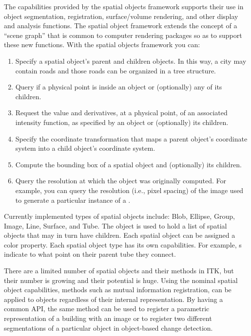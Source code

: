 The capabilities provided by the spatial objects framework supports their use
in object segmentation, registration, surface/volume rendering, and other
display and analysis functions. The spatial object framework extends the
concept of a ``scene graph''  that is common to computer rendering packages so
as to support these new functions. With the spatial objects framework you
can:
\begin{enumerate}

        \item Specify a spatial object's parent and children objects.  In
        this way, a city may contain roads and those roads can be
        organized in a tree structure.

        \item Query if a physical point is inside an object or
        (optionally) any of its children.

        \item Request the value and derivatives, at a physical point,
        of an associated intensity function, as specified
        by an object or (optionally) its children.

        \item Specify the coordinate transformation that maps a parent
        object's coordinate system into a child object's coordinate system.

        \item Compute the bounding box of a spatial object and (optionally)
        its children.

        \item Query the resolution at which the object was originally
        computed.  For example, you can query the resolution (i.e., pixel
        spacing) of the image used to generate a particular instance of a
        .
\end{enumerate}

Currently implemented types of spatial objects include: Blob, Ellipse,
Group, Image, Line, Surface, and Tube.  The 
object is used to hold a list of spatial objects that may in turn have
children.  Each spatial object can be assigned a color property.  Each
spatial object type has its own capabilities. For example,
s indicate to what point on their parent
tube they connect.

There are a limited number of spatial objects and their methods in ITK, but
their number is growing and their potential is huge. Using the nominal
spatial object capabilities, methods such as mutual
information registration, can be applied to objects regardless of their
internal representation. By having a common API, the same method can be used
to register a parametric representation of a building with an image or
to register two different segmentations of a particular object in
object-based change detection.

